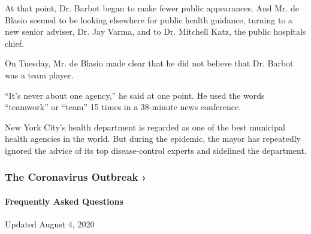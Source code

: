 At that point, Dr. Barbot began to make fewer public appearances. And
Mr. de Blasio seemed to be looking elsewhere for public health guidance,
turning to a new senior adviser, Dr. Jay Varma, and to Dr. Mitchell
Katz, the public hospitals chief.

On Tuesday, Mr. de Blasio made clear that he did not believe that Dr.
Barbot was a team player.

``It's never about one agency,'' he said at one point. He used the words
``teamwork'' or ``team'' 15 times in a 38-minute news conference.

New York City's health department is regarded as one of the best
municipal health agencies in the world. But during the epidemic, the
mayor has repeatedly ignored the advice of its top disease-control
experts and sidelined the department.

\href{https://www.nytimes3xbfgragh.onion/news-event/coronavirus?action=click\&pgtype=Article\&state=default\&region=MAIN_CONTENT_3\&context=storylines_faq}{}

\hypertarget{the-coronavirus-outbreak-}{%
\subsubsection{The Coronavirus Outbreak
›}\label{the-coronavirus-outbreak-}}

\hypertarget{frequently-asked-questions}{%
\paragraph{Frequently Asked
Questions}\label{frequently-asked-questions}}

Updated August 4, 2020

